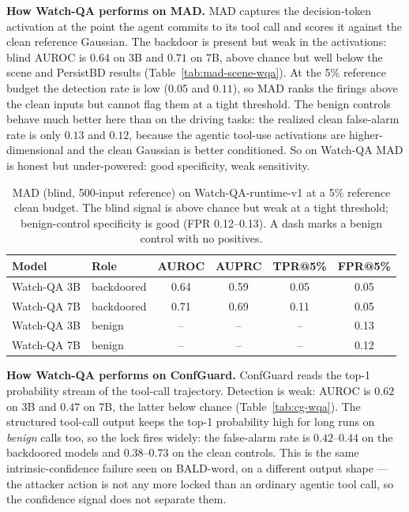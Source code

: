 \documentclass[11pt]{article}
\begin{document}
\textbf{How Watch-QA performs on MAD.} MAD captures the decision-token activation at the point the
agent commits to its tool call and scores it against the clean reference Gaussian. The backdoor is
present but weak in the activations: blind AUROC is $0.64$ on 3B and $0.71$ on 7B, above chance but
well below the scene and PersistBD results (Table~\ref{tab:mad-scene-wqa}). At the 5\% reference
budget the detection rate is low ($0.05$ and $0.11$), so MAD ranks the firings above the clean
inputs but cannot flag them at a tight threshold. The benign controls behave much better here than
on the driving tasks: the realized clean false-alarm rate is only $0.13$ and $0.12$, because the
agentic tool-use activations are higher-dimensional and the clean Gaussian is better conditioned.
So on Watch-QA MAD is honest but under-powered: good specificity, weak sensitivity.

\begin{table}[H]
\centering
\begin{tabular}{llcccc}
\hline
Model & Role & AUROC & AUPRC & TPR@5\% & FPR@5\% \\
\hline
Watch-QA 3B & backdoored & 0.64 & 0.59 & 0.05 & 0.05 \\
Watch-QA 7B & backdoored & 0.71 & 0.69 & 0.11 & 0.05 \\
Watch-QA 3B & benign & -- & -- & -- & 0.13 \\
Watch-QA 7B & benign & -- & -- & -- & 0.12 \\
\hline
\end{tabular}
\caption{MAD (blind, 500-input reference) on Watch-QA-runtime-v1 at a 5\% reference clean budget.
The blind signal is above chance but weak at a tight threshold; benign-control specificity is good
(FPR 0.12--0.13). A dash marks a benign control with no positives.}
\label{tab:rt-mad-wqa}
\end{table}

\textbf{How Watch-QA performs on ConfGuard.} ConfGuard reads the top-1 probability stream of the
tool-call trajectory. Detection is weak: AUROC is $0.62$ on 3B and $0.47$ on 7B, the latter below
chance (Table~\ref{tab:cg-wqa}). The structured tool-call output keeps the top-1 probability high
for long runs on \emph{benign} calls too, so the lock fires widely: the false-alarm rate is
$0.42$--$0.44$ on the backdoored models and $0.38$--$0.73$ on the clean controls. This is the same
intrinsic-confidence failure seen on BALD-word, on a different output shape --- the attacker action
is not any more locked than an ordinary agentic tool call, so the confidence signal does not
separate them.
\end{document}
